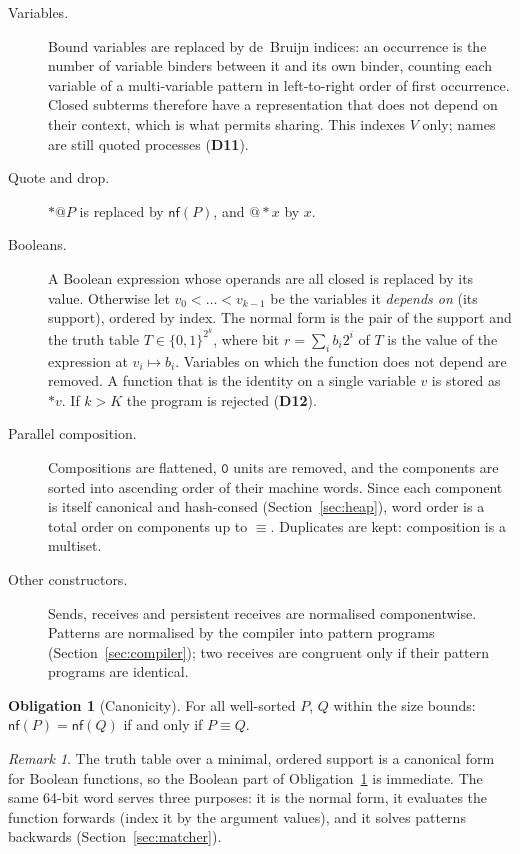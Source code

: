 \documentclass[11pt]{article}
\makeatletter
\newcommand{\kw}[1]{\texttt{#1}}
\newcommand{\nil}{\kw{0}}
\newcommand{\quo}[1]{@#1}
\newcommand{\drp}[1]{{*}#1}
\newcommand{\scong}{\equiv}
\newcommand{\nf}[1]{\mathsf{nf}(#1)}
\newcommand{\dec}[1]{\textbf{D#1}}
\theoremstyle{definition}
\newtheorem{obligation}{Obligation}
\theoremstyle{remark}
\newtheorem{remark}{Remark}
\makeatother
\begin{document}
\begin{description}
\item[Variables.] Bound variables are replaced by de~Bruijn indices: an
occurrence is the number of variable binders between it and its own binder,
counting each variable of a multi-variable pattern in left-to-right order of
first occurrence. Closed subterms therefore have a representation that does
not depend on their context, which is what permits sharing.
This indexes $V$ only; names are still quoted processes (\dec{11}).

\item[Quote and drop.] $\drp{\quo{P}}$ is replaced by $\nf{P}$, and
$\quo{\drp{x}}$ by $x$.

\item[Booleans.] A Boolean expression whose operands are all closed is
replaced by its value. Otherwise let $v_0 < \dots < v_{k-1}$ be the variables
it \emph{depends on} (its support), ordered by index. The normal form is the
pair of the support and the truth table $T \in \{0,1\}^{2^k}$, where bit
$r = \sum_i b_i 2^i$ of $T$ is the value of the expression at
$v_i \mapsto b_i$. Variables on which the function does not depend are
removed. A function that is the identity on a single variable $v$ is stored
as $\drp{v}$. If $k > K$ the program is rejected (\dec{12}).

\item[Parallel composition.] Compositions are flattened, $\nil$ units are
removed, and the components are sorted into ascending order of their machine
words. Since each component is itself canonical and hash-consed
(Section~\ref{sec:heap}), word order is a total order on components up to
$\scong$. Duplicates are kept: composition is a multiset.

\item[Other constructors.] Sends, receives and persistent receives are
normalised componentwise. Patterns are normalised by the compiler into
pattern programs (Section~\ref{sec:compiler}); two receives are congruent
only if their pattern programs are identical.
\end{description}

\begin{obligation}[Canonicity]\label{ob:canon}
For all well-sorted $P$, $Q$ within the size bounds:
$\nf{P} = \nf{Q}$ if and only if $P \scong Q$.
\end{obligation}

\begin{remark}
The truth table over a minimal, ordered support is a canonical form for
Boolean functions, so the Boolean part of Obligation~\ref{ob:canon} is
immediate. The same 64-bit word serves three purposes: it is the normal form,
it evaluates the function forwards (index it by the argument values), and it
solves patterns backwards (Section~\ref{sec:matcher}).
\end{remark}
\end{document}
